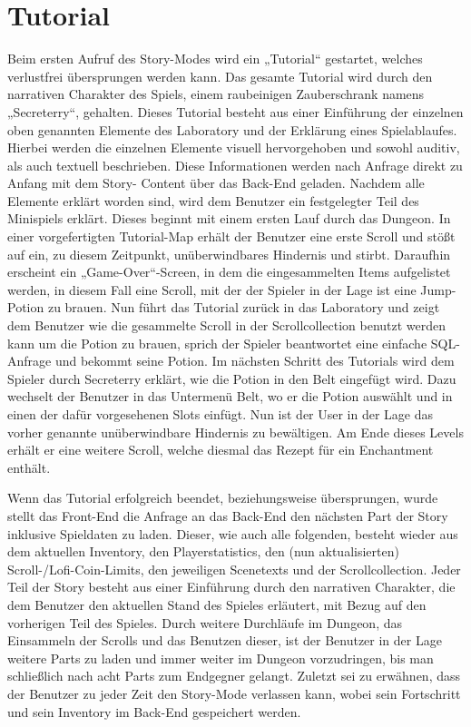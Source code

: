 \section{Tutorial}
Beim ersten Aufruf des Story-Modes wird ein „Tutorial“ gestartet, welches verlustfrei \"ubersprungen werden kann. Das gesamte Tutorial wird durch 
den narrativen Charakter des Spiels, einem raubeinigen Zauberschrank namens „Secreterry“, gehalten. Dieses Tutorial besteht aus einer Einf\"uhrung 
der einzelnen oben genannten Elemente des Laboratory und der Erkl\"arung eines Spielablaufes. Hierbei werden die einzelnen Elemente 
visuell hervorgehoben und sowohl auditiv, als auch textuell beschrieben. Diese Informationen werden nach Anfrage direkt zu Anfang mit dem Story-
Content \"uber das Back-End geladen. Nachdem alle Elemente erkl\"art worden sind, wird dem Benutzer ein festgelegter Teil des Minispiels erkl\"art. 
Dieses beginnt mit einem ersten Lauf durch das Dungeon. In einer vorgefertigten Tutorial-Map erh\"alt der Benutzer eine erste Scroll und st\"o{\ss}t auf ein, zu diesem Zeitpunkt, un\"uberwindbares Hindernis und stirbt. Daraufhin erscheint ein „Game-Over“-Screen, in dem die 
eingesammelten Items aufgelistet werden, in diesem Fall eine Scroll, mit der der Spieler in der Lage ist eine Jump-Potion zu brauen. Nun f\"uhrt 
das Tutorial zur\"uck in das Laboratory und zeigt dem Benutzer wie die gesammelte Scroll in der Scrollcollection benutzt werden kann um die 
Potion zu brauen, sprich der Spieler beantwortet eine einfache SQL-Anfrage und bekommt seine Potion. Im n\"achsten Schritt des Tutorials wird 
dem Spieler durch Secreterry erkl\"art, wie die Potion in den Belt eingef\"ugt wird. Dazu wechselt der Benutzer in das Untermen\"u Belt, wo er die 
Potion ausw\"ahlt und in einen der daf\"ur vorgesehenen Slots einf\"ugt. Nun ist der User in der Lage das vorher genannte un\"uberwindbare 
Hindernis zu bew\"altigen. Am Ende dieses Levels erh\"alt er eine weitere Scroll, welche diesmal das Rezept f\"ur ein Enchantment enth\"alt. 

Wenn das Tutorial erfolgreich beendet, beziehungsweise \"ubersprungen, wurde stellt das Front-End die Anfrage an das Back-End den n\"achsten 
Part der Story inklusive Spieldaten zu laden. Dieser, wie auch alle folgenden, besteht wieder aus dem aktuellen Inventory, den Playerstatistics, den 
(nun aktualisierten) Scroll-/Lofi-Coin-Limits, den jeweiligen Scenetexts und der Scrollcollection. Jeder Teil der Story besteht aus einer Einf\"uhrung durch 
den narrativen Charakter, die dem Benutzer den aktuellen Stand des Spieles erl\"autert, mit Bezug auf den vorherigen Teil des Spieles. Durch 
weitere Durchl\"aufe im Dungeon, das Einsammeln der Scrolls und das Benutzen dieser, ist der Benutzer in der Lage weitere Parts zu laden und 
immer weiter im Dungeon vorzudringen, bis man schlie{\ss}lich nach acht Parts zum Endgegner gelangt.
Zuletzt sei zu erw\"ahnen, dass der Benutzer zu jeder Zeit den Story-Mode verlassen kann, wobei sein Fortschritt und sein Inventory im Back-End 
gespeichert werden.

